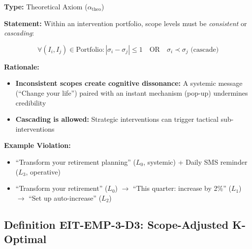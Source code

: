 \begin{tcolorbox}[colback=red!5!white, colframe=red!75!black,
    title=\textbf{Axiom EIT-EMP-3-A1: Scope Consistency Constraint}]

\textbf{Type:} Theoretical Axiom ($\alpha_{\text{theo}}$)

\textbf{Statement:} Within an intervention portfolio, scope levels must be \emph{consistent} or \emph{cascading}:

\begin{equation}
\forall (I_i, I_j) \in \text{Portfolio}: |\sigma_i - \sigma_j| \leq 1 \quad \text{OR} \quad \sigma_i \prec \sigma_j \text{ (cascade)}
\end{equation}

\textbf{Rationale:}
\begin{itemize}[nosep]
    \item \textbf{Inconsistent scopes create cognitive dissonance:} A systemic message (``Change your life'') paired with an instant mechanism (pop-up) undermines credibility
    \item \textbf{Cascading is allowed:} Strategic interventions can trigger tactical sub-interventions
\end{itemize}

\textbf{Example Violation:}
\begin{itemize}[nosep]
    \item[$\times$] ``Transform your retirement planning'' ($L_0$, systemic) + Daily SMS reminder ($L_3$, operative)
    \item[$\checkmark$] ``Transform your retirement'' ($L_0$) $\to$ ``This quarter: increase by 2\%'' ($L_1$) $\to$ ``Set up auto-increase'' ($L_2$)
\end{itemize}

\end{tcolorbox}

\subsection{Definition EIT-EMP-3-D3: Scope-Adjusted K-Optimal}
\label{subsec:scope-k-optimal}

